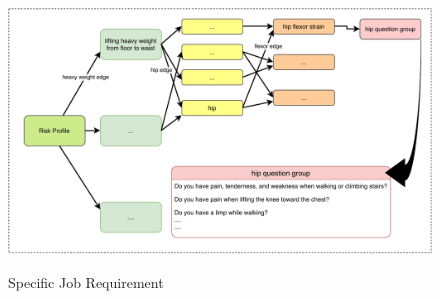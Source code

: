\begin{figure}[!htb]
    \caption{Specific Job Requirement}
    \includegraphics[width=1\columnwidth]{fig/SpecificJobRequirement.pdf}
    \label{fig:specificjobrequirement}
\end{figure}
